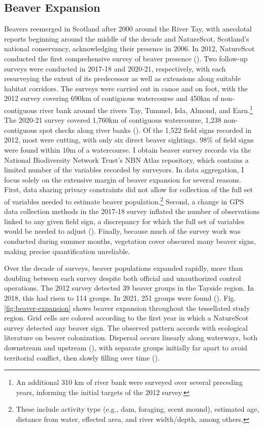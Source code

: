 \subsection{Beaver Expansion}
Beavers reemerged in Scotland after 2000 around the River Tay, with anecdotal reports beginning around the middle of the decade and NatureScot, Scotland's national conservancy, acknowledging their presence in 2006. In 2012, NatureScot conducted the first comprehensive survey of beaver presence (\cite{campbell_rd_naturescot_2012}). Two follow-up surveys were conducted in 2017-18 and 2020-21, respectively, with each resurveying the extent of its predecessor as well as extensions along suitable habitat corridors. The surveys were carried out in canoe and on foot, with the 2012 survey covering 690km of contiguous watercourse and 450km of non-contiguous river bank around the rivers Tay, Tummel, Isla, Almond, and Earn.\footnote{An additional 310 km of river bank were surveyed over several preceding years, informing the initial targets of the 2012 survey.} The 2020-21 survey covered 1,760km of contiguous watercourse, 1,238 non-contiguous spot checks along river banks (\cite{campbell-palmer_r_naturescot_2021}). Of the 1,522 field signs recorded in 2012, most were cutting, with only six direct beaver sightings. 98\% of field signs were found within 10m of a watercourse. I obtain beaver survey records via the National Biodiversity Network Trust's NBN Atlas repository, which contains a limited number of the variables recorded by surveyors. In data aggregation, I focus solely on the extensive margin of beaver expansion for several reasons. First, data sharing privacy constraints did not allow for collection of the full set of variables needed to estimate beaver population.\footnote{These include activity type (e.g., dam, foraging, scent mound), estimated age, distance from water, effected area, and river width/depth, among others.} Second, a change in GPS data collection methods in the 2017-18 survey inflated the number of observations linked to any given field sign, a discrepancy for which the full set of variables would be needed to adjust (\cite{campbell-palmer_r_naturescot_2018}). Finally, because much of the survey work was conducted during summer months, vegetation cover obscured many beaver signs, making precise quantification unreliable.

Over the decade of surveys, beaver populations expanded rapidly, more than doubling between each survey despite both official and unauthorized control operations. The 2012 survey detected 39 beaver groups in the Tayside region. In 2018, this had risen to 114 groups. In 2021, 251 groups were found (\cite{campbell-palmer_r_naturescot_2021}). Fig. \ref{fig:beaver-expansion} shows beaver expansion throughout the tessellated study region. Grid cells are colored according to the first year in which a NatureScot survey detected any beaver sign. The observed pattern accords with ecological literature on beaver colonization. Dispersal occurs linearly along waterways, both downstream and upstream (\cite{muller-schwarze_beaver_2011}), with separate groups initially far apart to avoid territorial conflict, then slowly filling over time (\cite{hartman_patterns_1995}).

